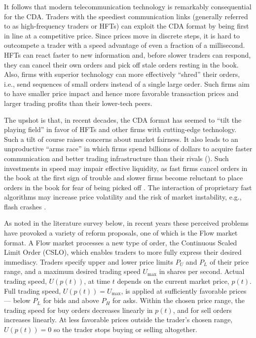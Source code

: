 \documentclass[12pt]{article}
\begin{document}
It follows that modern telecommunication technology is remarkably consequential for the CDA. Traders   
with the speediest communication links (generally referred to as  high-frequency traders or HFTs)
can exploit the CDA format by being first in line at a competitive price. Since prices move in discrete steps, it is hard to outcompete a trader with a speed advantage of even a fraction of a millisecond. 
HFTs can react faster to new information and, before slower traders can respond, they can cancel their own orders and pick off stale orders resting in the book. 
Also, firms with superior technology can more effectively ``shred'' their orders, i.e., send sequences of small orders instead of a single large order.
Such firms aim to have smaller price impact and hence more favorable transaction prices and larger trading profits than their lower-tech peers. 

The upshot is that, in recent decades, the CDA format has 
seemed to ``tilt the playing field'' in favor of HFTs and other firms with cutting-edge technology. 
Such a tilt of course raises concerns about market fairness. 
It also
leads to an unproductive ``arms race'' in which firms spend billions of dollars to acquire faster communication and better trading infrastructure than their rivals (\citealp{Budish2015}).
Such investments in speed may impair  effective liquidity, as fast firms cancel orders in the book at the first sign of trouble and slower firms become reluctant to place orders in the book for fear of being picked off \citep{Easly2012}.
The interaction of proprietary fast algorithms may increase price volatility and the risk of  market instability, e.g., flash crashes \citep{aldrich2017flash}.

As noted in the literature survey below, in recent years these perceived problems have provoked a variety of reform proposals, one of which is the Flow market format. 
A Flow market  processes a new type of order, the Continuous Scaled Limit Order (CSLO), which %
enables traders to more fully express their desired immediacy. 
Traders specify upper and lower price limits $P_U$ and $P_L$ of their price range, and a maximum desired trading speed $U_{\max}$ in shares per second. 
Actual 
trading speed, \(U(p(t))\), at time $t$ depends on the current market price, \(p(t)\). Full trading speed,
$U(p(t))=U_{\max}$, is applied at sufficiently favorable prices --- below \(P_L\) for bids and above \(P_H\) for asks. Within the chosen price range, the trading speed for buy orders decreases linearly in $p(t)$, and for sell orders increases linearly.
At less favorable prices outside the trader's chosen range,
$U(p(t))=0$ so the trader stops buying or selling altogether. 
\end{document}
